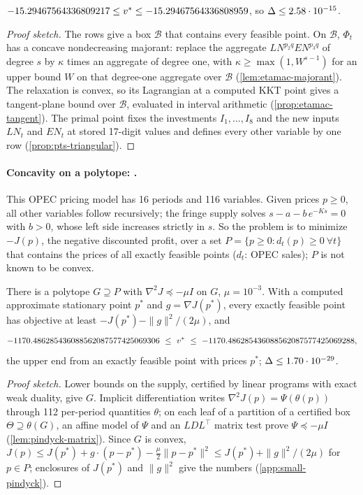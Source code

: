 \begin{theorem}\label{thm:etamac-bound}
$-15.29467564336809217\le v^{*}\le-15.29467564336808959$, so $\Delta\le2.58\cdot10^{-15}$.
\end{theorem}

\begin{proof}[Proof sketch]
The rows give a box $\mathcal B$ that contains every feasible point.
On $\mathcal B$, $\Phi_t$ has a concave nondecreasing majorant: replace the aggregate $L\!N^{p_2q}E\!N^{p_3q}$ of degree $s$ by $\kappa$ times an aggregate of degree one, with $\kappa\ge\max(1,W^{s-1})$ for an upper bound $W$ on that degree-one aggregate over $\mathcal B$ (\cref{lem:etamac-majorant}).
The relaxation is convex, so its Lagrangian at a computed KKT point gives a tangent-plane bound over $\mathcal B$, evaluated in interval arithmetic (\cref{prop:etamac-tangent}).
The primal point fixes the investments $I_1,\dots,I_8$ and the new inputs $L\!N_t$ and $E\!N_t$ at stored 17-digit values and defines every other variable by one row (\cref{prop:pts-triangular}).
\end{proof}

\paragraph{Concavity on a polytope: .}
This OPEC pricing model has 16 periods and 116 variables.
Given prices $p\ge0$, all other variables follow recursively; the fringe supply solves $s-a-b\,e^{-Ks}=0$ with $b>0$, whose left side increases strictly in $s$.
So the problem is to minimize $-J(p)$, the negative discounted profit, over a set $P=\{p\ge0:d_t(p)\ge0\ \forall t\}$ that contains the prices of all exactly feasible points ($d_t$: OPEC sales); $P$ is not known to be convex.

\begin{theorem}\label{thm:pindyck-bound}
There is a polytope $G\supseteq P$ with $\nabla^2J\preceq-\mu I$ on $G$, $\mu=10^{-3}$.
With a computed approximate stationary point $p^*$ and $g=\nabla J(p^*)$, every exactly feasible point has objective at least $-J(p^*)-\|g\|^2/(2\mu)$, and
\[
-1170.486285436088562087577425069306\ \le\ \vstar\ \le\ -1170.486285436088562087577425069288,
\]
the upper end from an exactly feasible point with prices $p^*$; $\Delta\le1.70\cdot10^{-29}$.
\end{theorem}

\begin{proof}[Proof sketch]
Lower bounds on the supply, certified by linear programs with exact weak duality, give $G$.
Implicit differentiation writes $\nabla^2J(p)=\Psi(\theta(p))$ through 112 per-period quantities $\theta$; on each leaf of a partition of a certified box $\Theta\supseteq\theta(G)$, an affine model of $\Psi$ and an $LDL^\top$ matrix test prove $\Psi\preceq-\mu I$ (\cref{lem:pindyck-matrix}).
Since $G$ is convex, $J(p)\le J(p^*)+g\cdot(p-p^*)-\frac\mu2\|p-p^*\|^2\le J(p^*)+\|g\|^2/(2\mu)$ for $p\in P$; enclosures of $J(p^*)$ and $\|g\|^2$ give the numbers (\cref{app:small-pindyck}).
\end{proof}

